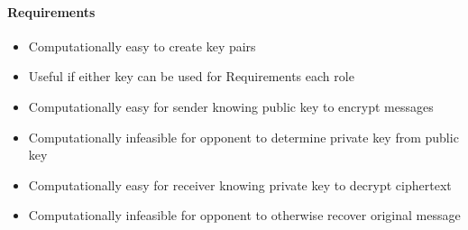 \documentclass{article}
\begin{document}
                                    \paragraph{Requirements}
                                    \begin{itemize}
                                        \item Computationally easy to create key pairs
                                        \item Useful if either key can be used for Requirements each role
                                        \item Computationally easy for sender knowing public key to encrypt messages
                                        \item Computationally infeasible for opponent to determine private key from public key
                                        \item Computationally easy for receiver knowing private key to decrypt ciphertext
                                        \item Computationally infeasible for opponent to otherwise recover original message
                                    \end{itemize}
                                    \newpage
\end{document}
